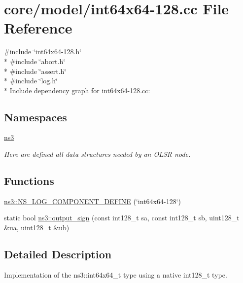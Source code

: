 \hypertarget{int64x64-128_8cc}{}\section{core/model/int64x64-\/128.cc File Reference}
\label{int64x64-128_8cc}
{\ttfamily \#include \char`\"{}int64x64-\/128.\+h\char`\"{}}\\*
{\ttfamily \#include \char`\"{}abort.\+h\char`\"{}}\\*
{\ttfamily \#include \char`\"{}assert.\+h\char`\"{}}\\*
{\ttfamily \#include \char`\"{}log.\+h\char`\"{}}\\*
Include dependency graph for int64x64-\/128.cc\+:
\subsection*{Namespaces}
\begin{DoxyCompactItemize}
\item 
 \hyperlink{namespacens3}{ns3}
\begin{DoxyCompactList}\small\item\em Here are defined all data structures needed by an O\+L\+SR node. \end{DoxyCompactList}\end{DoxyCompactItemize}
\subsection*{Functions}
\begin{DoxyCompactItemize}
\item 
\hyperlink{namespacens3_a07266918dcaa757e639a50e43374b81d}{ns3\+::\+N\+S\+\_\+\+L\+O\+G\+\_\+\+C\+O\+M\+P\+O\+N\+E\+N\+T\+\_\+\+D\+E\+F\+I\+NE} (\char`\"{}int64x64-\/128\char`\"{})
\item 
static bool \hyperlink{group__highprec_gaeeaaf0f56a7e311cabc5db7213d91779}{ns3\+::output\+\_\+sign} (const int128\+\_\+t sa, const int128\+\_\+t sb, uint128\+\_\+t \&ua, uint128\+\_\+t \&ub)
\end{DoxyCompactItemize}


\subsection{Detailed Description}
Implementation of the ns3\+::int64x64\+\_\+t type using a native int128\+\_\+t type. 